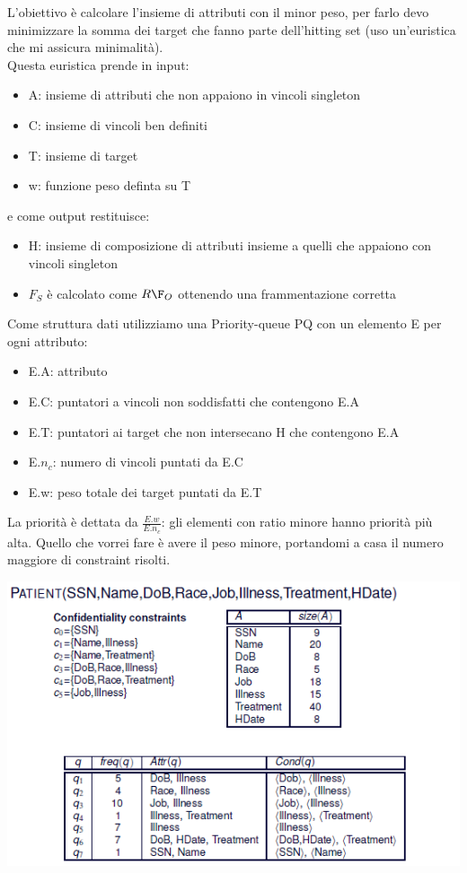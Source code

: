 L'obiettivo è calcolare l'insieme di attributi con il minor peso, per farlo devo minimizzare la somma dei target che fanno parte dell'hitting set (uso un'euristica che mi assicura minimalità).\\
Questa euristica prende in input:
\begin{itemize}
    \item A: insieme di attributi che non appaiono in vincoli singleton
    \item C: insieme di vincoli ben definiti
    \item T: insieme di target
    \item w: funzione peso definta su T
\end{itemize}
e come output restituisce:
\begin{itemize}
    \item H: insieme di composizione di attributi insieme a quelli che appaiono con vincoli singleton 
    \item \(F_S\) è calcolato come \(R\F_O\) ottenendo una frammentazione corretta
\end{itemize}
Come struttura dati utilizziamo una Priority-queue PQ con un elemento E per ogni attributo:\
\begin{itemize}
    \item E.A: attributo
    \item E.C: puntatori a vincoli non soddisfatti che contengono E.A
    \item E.T: puntatori ai target che non intersecano H che contengono E.A
    \item E.\(n_c\): numero di vincoli puntati da E.C
    \item E.w: peso totale dei target puntati da E.T
\end{itemize}
La priorità è dettata da \(\frac{E.w}{E.n_c}\): gli elementi con ratio minore hanno priorità più alta. Quello che vorrei fare è avere il peso minore, portandomi a casa il numero maggiore di constraint risolti.
\begin{center}
    \includegraphics[scale=0.7]{img/heuristic.png}
\end{center}
